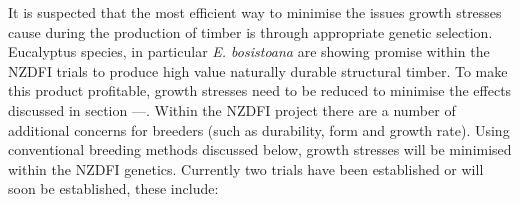 It is suspected that the most efficient way to minimise the issues growth
stresses cause during the production of timber is through appropriate genetic
selection. Eucalyptus species, in particular \textit{E. bosistoana} are showing
promise within the NZDFI trials to produce high value naturally durable
structural timber. To make this
product profitable, growth stresses need to be reduced to minimise the effects
discussed in section ---. Within the NZDFI project there are a number of
additional concerns for breeders (such as durability, form and growth rate). Using conventional breeding methods
discussed below, growth stresses will be minimised within the NZDFI genetics.
Currently two trials have been established or will soon be established, these
include: